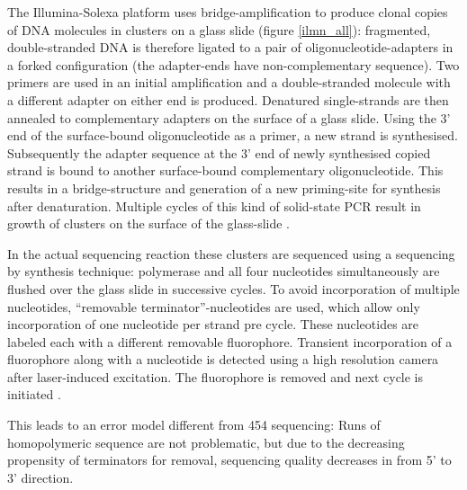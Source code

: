 
The Illumina-Solexa platform uses bridge-amplification to produce
clonal copies of DNA molecules in clusters on a glass slide (figure
\ref{ilmn_all}): fragmented, double-stranded DNA is therefore ligated to
a pair of oligonucleotide-adapters in a forked configuration (the
adapter-ends have non-complementary sequence). Two primers are used in
an initial amplification and a double-stranded molecule with a
different adapter on either end is produced. Denatured single-strands
are then annealed to complementary adapters on the surface of a glass
slide. Using the 3' end of the surface-bound oligonucleotide as a
primer, a new strand is synthesised. Subsequently the adapter sequence
at the 3' end of newly synthesised copied strand is bound to another
surface-bound complementary oligonucleotide. This results in a
bridge-structure and generation of a new priming-site for synthesis
after denaturation. Multiple cycles of this kind of solid-state PCR
result in growth of clusters on the surface of the glass-slide
\cite{pmid18987734}.

In the actual sequencing reaction these clusters are sequenced using a
sequencing by synthesis technique: polymerase and all four nucleotides
simultaneously are flushed over the glass slide in successive
cycles. To avoid incorporation of multiple nucleotides, ``removable
terminator''-nucleotides are used, which allow only incorporation of
one nucleotide per strand pre cycle. These nucleotides are labeled
each with a different removable fluorophore. Transient incorporation
of a fluorophore along with a nucleotide is detected using a high
resolution camera after laser-induced excitation. The fluorophore is
removed and next cycle is initiated \cite{pmid18987734}.

This leads to an error model different from 454 sequencing: Runs of
homopolymeric sequence are not problematic, but due to the decreasing
propensity of terminators for removal, sequencing quality decreases in
from 5' to 3' direction.


